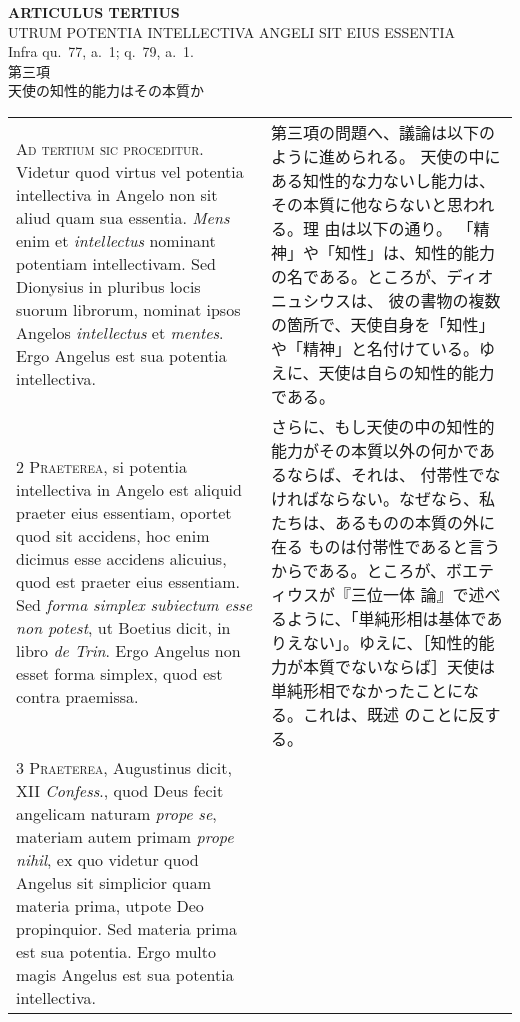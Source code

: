 \documentclass[10pt]{jsarticle} %
\begin{document}
\begin{center}
 {\Large {\bf ARTICULUS TERTIUS}}\\
 {\large UTRUM POTENTIA INTELLECTIVA ANGELI SIT EIUS ESSENTIA}\\
 {\footnotesize Infra qu.~77, a.~1; q.~79, a.~1.}\\
 {\Large 第三項\\天使の知性的能力はその本質か}
\end{center}

\begin{longtable}{p{21em}p{21em}}

{\huge A}{\scshape d tertium sic proceditur}. Videtur quod
virtus vel potentia intellectiva in Angelo non sit aliud quam sua
essentia. {\itshape Mens} enim et {\itshape intellectus} nominant potentiam intellectivam. Sed
Dionysius in pluribus locis suorum librorum, nominat ipsos Angelos
{\itshape intellectus} et {\itshape mentes}. Ergo Angelus est sua potentia intellectiva.

&
第三項の問題へ、議論は以下のように進められる。
天使の中にある知性的な力ないし能力は、その本質に他ならないと思われる。理
 由は以下の通り。
「精神」や「知性」は、知性的能力の名である。ところが、ディオニュシウスは、
 彼の書物の複数の箇所で、天使自身を「知性」や「精神」と名付けている。ゆ
 えに、天使は自らの知性的能力である。


\\


{\scshape 2 Praeterea}, si potentia intellectiva in
Angelo est aliquid praeter eius essentiam, oportet quod sit accidens,
hoc enim dicimus esse accidens alicuius, quod est praeter eius
essentiam. Sed {\itshape forma simplex subiectum esse non potest}, ut Boetius
dicit, in libro {\itshape de Trin}. Ergo Angelus non esset forma simplex, quod est
contra praemissa.

&
さらに、もし天使の中の知性的能力がその本質以外の何かであるならば、それは、
 付帯性でなければならない。なぜなら、私たちは、あるものの本質の外に在る
 ものは付帯性であると言うからである。ところが、ボエティウスが『三位一体
 論』で述べるように、「単純形相は基体でありえない」。ゆえに、［知性的能
 力が本質でないならば］天使は単純形相でなかったことになる。これは、既述
 のことに反する。

\\


{\scshape 3 Praeterea}, Augustinus dicit, XII {\itshape Confess}.,
quod Deus fecit angelicam naturam {\itshape prope se}, materiam autem primam {\itshape prope
nihil}, ex quo videtur quod Angelus sit simplicior quam materia prima,
utpote Deo propinquior. Sed materia prima est sua potentia. Ergo multo
magis Angelus est sua potentia intellectiva.


\end{longtable}
\end{document}
